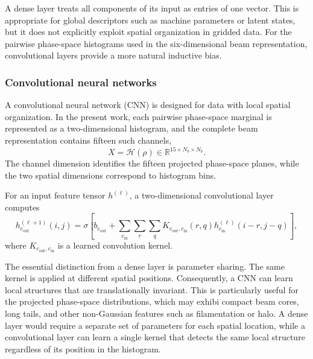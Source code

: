 A dense layer treats all components of its input as entries of one vector. This is appropriate for global descriptors such as machine parameters or latent states, but it does not explicitly exploit spatial organization in gridded data. For the pairwise phase-space histograms used in the six-dimensional beam representation, convolutional layers provide a more natural inductive bias.

\subsubsection{Convolutional neural networks}
\label{subsubsec:cnn_foundations}

A convolutional neural network (CNN) is designed for data with local spatial organization. In the present work, each pairwise phase-space marginal is represented as a two-dimensional histogram, and the complete beam representation contains fifteen such channels, 
\begin{equation}
    X
    =
    \mathcal{H}(\rho)
    \in
    \mathbb{R}^{15\times N_b\times N_b}.
\end{equation}
The channel dimension identifies the fifteen projected phase-space planes, while the two spatial dimensions correspond to histogram bins.

For an input feature tensor
$h^{(\ell)}$,
a two-dimensional convolutional layer computes
\begin{equation}
    h_{c_{\mathrm{out}}}^{(\ell+1)}(i,j)
    =
    \sigma
    \left[
    b_{c_{\mathrm{out}}}
    +
    \sum_{c_{\mathrm{in}}}
    \sum_{r}
    \sum_{q}
    K_{c_{\mathrm{out}},c_{\mathrm{in}}}(r,q)
    h_{c_{\mathrm{in}}}^{(\ell)}(i-r,j-q)
    \right],
    \label{eq:cnn_convolution_basic}
\end{equation}
where
$K_{c_{\mathrm{out}},c_{\mathrm{in}}}$
is a learned convolution kernel.

The essential distinction from a dense layer is parameter sharing. The same kernel is applied at different spatial positions. Consequently, a CNN can learn local structures that are translationally invariant. This is particularly useful for the projected phase-space distributions, which may exhibi compact beam cores, long tails, and other non-Gaussian features such as filamentation or halo. A dense layer would require a separate set of parameters for each spatial location, while a convolutional layer can learn a single kernel that detects the same local structure regardless of its position in the histogram.

